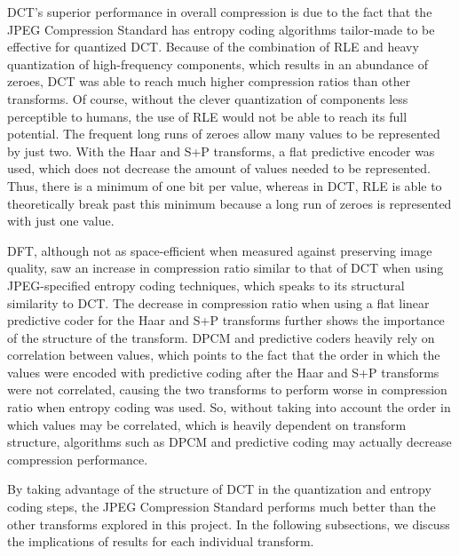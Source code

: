 DCT's superior performance in overall compression is due to the fact that the JPEG Compression Standard has entropy coding algorithms tailor-made to
be effective for quantized DCT. Because of the combination of RLE and heavy quantization of high-frequency components, which results in an abundance of zeroes,
DCT was able to reach much higher compression ratios than other transforms. Of course, without the clever quantization of components less perceptible to humans,
the use of RLE would not be able to reach its full potential. The frequent long runs of zeroes allow many values to be represented by just two. With the Haar and S+P
transforms, a flat predictive encoder was used, which does not decrease the amount of values needed to be represented. Thus, there is a minimum of one bit per value,
whereas in DCT, RLE is able to theoretically break past this minimum because a long run of zeroes is represented with just one value.

DFT, although not as space-efficient when measured against preserving image quality, saw an increase in compression ratio similar
to that of DCT when using JPEG-specified entropy coding techniques, which speaks to its structural similarity to DCT.
The decrease in compression ratio when using a flat linear predictive coder for the Haar and S+P transforms further shows the importance of the structure of
the transform. DPCM and predictive coders heavily rely on correlation between values, which points to the fact that the order in which the values were encoded
with predictive coding after the Haar and S+P transforms were not correlated, causing the two transforms to perform worse in compression ratio when entropy
coding was used.
So, without taking into account the order in which values may be correlated, which is heavily dependent on transform structure, algorithms such as DPCM and predictive
coding may actually decrease compression performance.

By taking advantage of the structure of DCT in the quantization and entropy coding steps, the JPEG Compression Standard performs much better
than the other transforms explored in this project. In the following subsections, we discuss the implications of results for each individual transform.